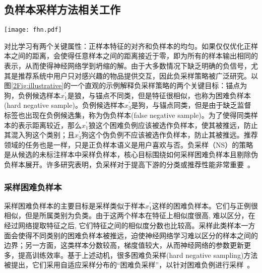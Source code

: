 \subsection{负样本采样方法相关工作}
\begin{figure*}[!]
	\centering
	\texttt{[image: fhn.pdf]}
	\caption{困难负例和伪负例示意图}
	\label{2Fig:illustrative}
\end{figure*}
对比学习有两个关键属性：正样本特征的对齐和负样本的均匀\cite{Wang:2020:ICML}。如果仅仅优化正样本之间的距离，会使得任意样本之间的距离接近于零，即为所有的样本输出相同的表示，从而使得神经网络学到坍缩的解。由于大多数情况下缺乏明确的负信号，尤其是推荐系统中用户只对感兴趣的物品提供交互，因此负采样策略被广泛研究。以图\ref{2Fig:illustrative}的一个直观的示例解释负采样策略的两个关键目标：锚点为狗，负例候选样本$x_1^\prime$是狼，与锚点不同类，但是特征很相似，也称为困难负样本(hard negative sample)。负例候选样本$x_3^\prime$是狗，与锚点同类，但是由于缺乏监督标签也出现在负例候选集，称为伪负样本(false negative sample)。为了使得同类样本的表示距离较近，那么$x_1^\prime$狼这个困难负例应该被选作负样本，使其被推远，防止其混入狗这个类别；且$x_3^\prime$狗这个伪负例不应该被选作负样本，防止其被推远。推荐领域的任务也是一样，只是正负样本语义是用户喜欢与否。负采样（NS）的策略是从候选的未标注样本中采样负样本，核心目标围绕如何采样困难负样本且剔除伪负样本展开。许多研究表明，负采样对于提高下游的分类或推荐性能非常重要~\cite{Steffen:2014:WSDM,Zhang:2013:SIGIR,Ding:2020:NIPS,Park:2019:WWW,Huang:2021:KDD,Ding:2019:IJCAI,Yang:2020:KDD}。

\subsubsection{采样困难负样本}
采样困难负样本的主要目标是采样类似于样本$x_1^\prime$这样的困难负样本。它们与正例很相似，但是所属类别为负类。由于这两个样本在特征上相似度很高, 难以区分，在经过网络提取特征之后, 它们特征之间的相似度分数也比较高。采样此类样本一方面会使得不同类别的困难负样本被推远，迫使神经网络学习难以区分的样本之间的边界；另一方面，这类样本分数较高，梯度值较大，从而神经网络的参数更新更多，提高训练效率。基于上述动机，很多困难负采样(hard negative sampling)方法被提出，它们采用自适应采样分布的“困难负采样”，以针对困难负例进行采样~\cite{Steffen:2014:WSDM,Zhang:2013:SIGIR,Ding:2020:NIPS,Park:2019:WWW,Huang:2021:KDD,Ding:2019:IJCAI}。

